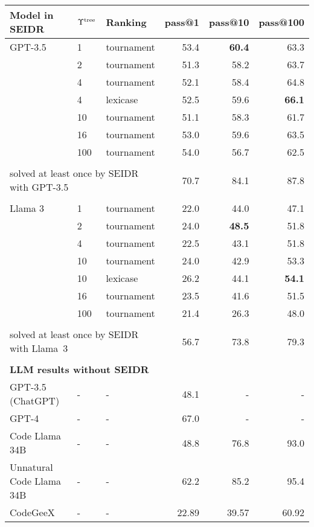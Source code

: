 \begin{tabular}{lllrrr}
\toprule
Model in SEIDR & $\Upsilon^\text{tree}$ & Ranking &  pass@1 &  pass@10 &  pass@100 \\
\midrule
GPT-3.5 & 1   &         tournament &    53.4 &     \textbf{60.4} &      63.3 \\
        & 2   &         tournament &    51.3 &     58.2 &      63.7 \\
        & 4   &         tournament &    52.1 &     58.4 &      64.8 \\
        & 4   &           lexicase &    52.5 &     59.6 &      \textbf{66.1} \\
        & 10  &         tournament &    51.1 &     58.3 &      61.7 \\
        & 16  &         tournament &    53.0 &     59.6 &      63.5 \\
        & 100 &         tournament &    54.0 &     56.7 &      62.5 \\[1pt]
\cline{2-6}\\[-8pt]
\multicolumn{3}{l}{solved at least once by SEIDR with GPT-3.5}   & 70.7 &     84.1 &      87.8 \\[1pt]
\cline{1-6}\\[-8pt]
Llama 3 & 1   &         tournament &    22.0 &     44.0 &      47.1 \\
        & 2   &         tournament &    24.0 &     \textbf{48.5 }&      51.8 \\
        & 4   &         tournament &    22.5 &     43.1 &      51.8 \\
        & 10  &         tournament &    24.0 &     42.9 &      53.3 \\
        & 10  &           lexicase &    26.2 &     44.1 &      \textbf{54.1} \\
        & 16  &         tournament &    23.5 &     41.6 &      51.5 \\
        & 100 &         tournament &    21.4 &     26.3 &      48.0  \\[1pt]
\cline{2-6}\\[-8pt]
\multicolumn{3}{l}{solved at least once by SEIDR with Llama~3} & 56.7 &     73.8 &      79.3 \\[1pt]
\cline{1-6}\\[-8pt]
\multicolumn{6}{l}{\textbf{LLM results without SEIDR}} \\
GPT-3.5 (ChatGPT) & - &  - &  48.1  &  -   &    - \\
GPT-4 & - &  - & 67.0   &  -   &    - \\
Code Llama 34B & - &  - &  48.8  &  76.8   &    93.0 \\
Unnatural Code Llama 34B & - &  - &  62.2  &  85.2   &    95.4 \\
CodeGeeX & - &  - &  22.89  &  39.57   &    60.92 \\[-2pt]
\bottomrule
\end{tabular}